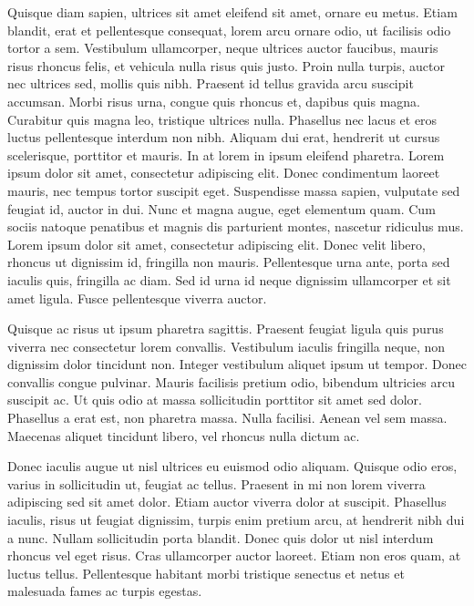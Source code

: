 Quisque diam sapien, ultrices sit amet eleifend sit amet, ornare eu metus.
Etiam blandit, erat et pellentesque consequat, lorem arcu ornare odio, ut facilisis odio tortor a sem.
Vestibulum ullamcorper, neque ultrices auctor faucibus, mauris risus rhoncus felis, et vehicula nulla risus quis justo.
Proin nulla turpis, auctor nec ultrices sed, mollis quis nibh.
Praesent id tellus gravida arcu suscipit accumsan.
Morbi risus urna, congue quis rhoncus et, dapibus quis magna.
Curabitur quis magna leo, tristique ultrices nulla.
Phasellus nec lacus et eros luctus pellentesque interdum non nibh.
Aliquam dui erat, hendrerit ut cursus scelerisque, porttitor et mauris.
In at lorem in ipsum eleifend pharetra.
Lorem ipsum dolor sit amet, consectetur adipiscing elit.
Donec condimentum laoreet mauris, nec tempus tortor suscipit eget.
Suspendisse massa sapien, vulputate sed feugiat id, auctor in dui.
Nunc et magna augue, eget elementum quam.
Cum sociis natoque penatibus et magnis dis parturient montes, nascetur ridiculus mus.
Lorem ipsum dolor sit amet, consectetur adipiscing elit.
Donec velit libero, rhoncus ut dignissim id, fringilla non mauris.
Pellentesque urna ante, porta sed iaculis quis, fringilla ac diam.
Sed id urna id neque dignissim ullamcorper et sit amet ligula.
Fusce pellentesque viverra auctor.

Quisque ac risus ut ipsum pharetra sagittis.
Praesent feugiat ligula quis purus viverra nec consectetur lorem convallis.
Vestibulum iaculis fringilla neque, non dignissim dolor tincidunt non.
Integer vestibulum aliquet ipsum ut tempor.
Donec convallis congue pulvinar.
Mauris facilisis pretium odio, bibendum ultricies arcu suscipit ac.
Ut quis odio at massa sollicitudin porttitor sit amet sed dolor.
Phasellus a erat est, non pharetra massa.
Nulla facilisi.
Aenean vel sem massa.
Maecenas aliquet tincidunt libero, vel rhoncus nulla dictum ac.

Donec iaculis augue ut nisl ultrices eu euismod odio aliquam.
Quisque odio eros, varius in sollicitudin ut, feugiat ac tellus.
Praesent in mi non lorem viverra adipiscing sed sit amet dolor.
Etiam auctor viverra dolor at suscipit.
Phasellus iaculis, risus ut feugiat dignissim, turpis enim pretium arcu, at hendrerit nibh dui a nunc.
Nullam sollicitudin porta blandit.
Donec quis dolor ut nisl interdum rhoncus vel eget risus.
Cras ullamcorper auctor laoreet.
Etiam non eros quam, at luctus tellus.
Pellentesque habitant morbi tristique senectus et netus et malesuada fames ac turpis egestas.


